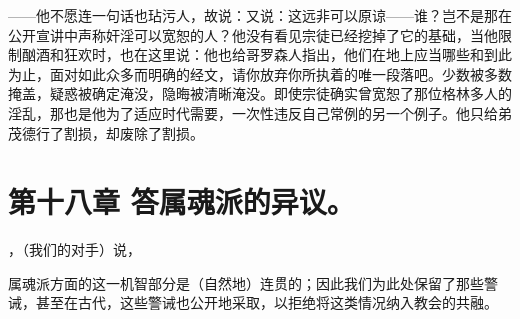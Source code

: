 ——他不愿连一句话也玷污人，故说：又说：这远非可以原谅——谁？岂不是那在公开宣讲中声称奸淫可以宽恕的人？他没有看见宗徒已经挖掉了它的基础，当他限制酗酒和狂欢时，也在这里说：他也给哥罗森人指出，他们在地上应当哪些和到此为止，面对如此众多而明确的经文，请你放弃你所执着的唯一段落吧。少数被多数掩盖，疑惑被确定淹没，隐晦被清晰淹没。即使宗徒确实曾宽恕了那位格林多人的淫乱，那也是他为了适应时代需要，一次性违反自己常例的另一个例子。他只给弟茂德行了割损，却废除了割损。\par


\section{第十八章 答属魂派的异议。}

，（我们的对手）说，\par

属魂派方面的这一机智部分是（自然地）连贯的；因此我们为此处保留了那些警诫，甚至在古代，这些警诫也公开地采取，以拒绝将这类情况纳入教会的共融。\par

